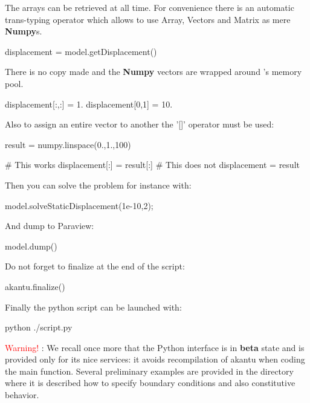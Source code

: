 The \akantu arrays can be retrieved at all time. For convenience there
is an automatic trans-typing operator which allows to use \akantu
Array, Vectors and Matrix as mere \textbf{Numpy}s.

\begin{python}
displacement = model.getDisplacement()
\end{python}

There is no copy made and the \textbf{Numpy} vectors are wrapped
around \akantu's memory pool.

\begin{python}
displacement[:,:] = 1.
displacement[0,1] = 10.
\end{python}

Also to assign an entire vector to another the '[]' operator must be
used:

\begin{python}
result = numpy.linspace(0.,1.,100)

# This works
displacement[:] = result[:]
# This does not
displacement = result
\end{python}

Then you can solve the problem for instance with:
\begin{python}
model.solveStaticDisplacement(1e-10,2);
\end{python}
And dump to Paraview:
\begin{python}
model.dump()
\end{python}

Do not forget to finalize at the end of the script:
\begin{python}
akantu.finalize()
\end{python}

Finally the python script can be launched with:
\begin{command}
python ./script.py
\end{command}

\vspace{1cm}

\textcolor{red}{Warning!} : We recall once more that the Python
interface is in \textbf{beta} state and is provided only for its nice
services: it avoids recompilation of akantu when coding the main function.
Several preliminary examples are provided
in the  directory where it is described how to specify
boundary conditions and also constitutive behavior.
